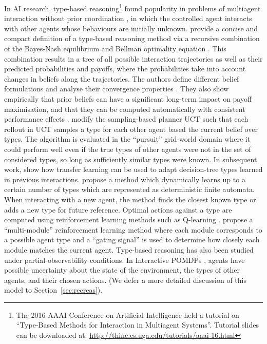 \documentclass[final,1p,times,authoryear]{elsarticle}
\begin{document}
In AI research, type-based reasoning\footnote{The 2016 AAAI Conference on Artificial Intelligence held a tutorial on ``Type-Based Methods for Interaction in Multiagent Systems''. Tutorial slides can be downloaded at: \url{http://thinc.cs.uga.edu/tutorials/aaai-16.html}} found popularity in problems of multiagent interaction without prior coordination \citep{als2016mipc,skkr2010}, in which the controlled agent interacts with other agents whose behaviours are initially unknown. \citet{acr2016aij} provide a concise and compact definition of a type-based reasoning method via a recursive combination of the Bayes-Nash equilibrium \citep{h1968a} and Bellman optimality equation \citep{b1957}. This combination results in a tree of all possible interaction trajectories as well as their predicted probabilities and payoffs, where the probabilities take into account changes in beliefs along the trajectories. The authors define different belief formulations and analyse their convergence properties \citep{ar2014}. They also show empirically that prior beliefs can have a significant long-term impact on payoff maximisation, and that they can be computed automatically with consistent performance effects \citep{acr2015}. \citet{bsk2011} modify the sampling-based planner UCT \citep{ks2006} such that each rollout in UCT samples a type for each other agent based the current belief over types. The algorithm is evaluated in the ``pursuit'' grid-world domain where it could perform well even if the true types of other agents were not in the set of considered types, so long as sufficiently similar types were known. In subsequent work, \citet{bskr2013} show how transfer learning can be used to adapt decision-tree types learned in previous interactions. \citet{rw2003} propose a method which dynamically learns up to a certain number of types which are represented as deterministic finite automata. When interacting with a new agent, the method finds the closest known type or adds a new type for future reference. Optimal actions against a type are computed using reinforcement learning methods such as Q-learning \citep{wd1992}. \citet{tea2002} propose a ``multi-module'' reinforcement learning method where each module corresponds to a possible agent type and a ``gating signal'' is used to determine how closely each module matches the current agent. Type-based reasoning has also been studied under partial-observability conditions. In Interactive POMDPs \citep{gd2005}, agents have possible uncertainty about the state of the environment, the types of other agents, and their chosen actions. (We defer a more detailed discussion of this model to Section~\ref{sec:recreas}).
\end{document}
